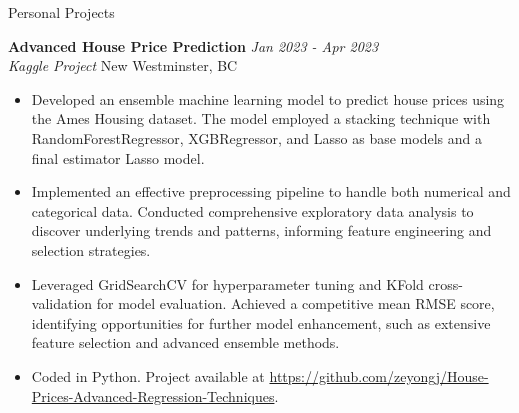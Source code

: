 \documentclass{resume} %
\begin{document}
\begin{rSection}{Personal Projects}

{\bf Advanced House Price Prediction} \hfill {\em Jan 2023 - Apr 2023}
\\{\textit{Kaggle Project} \hfill {New Westminster, BC}}
\begin{itemize}
    \vspace{-0.2cm}\item Developed an ensemble machine learning model to predict house prices using the Ames Housing dataset. The model employed a stacking technique with RandomForestRegressor, XGBRegressor, and Lasso as base models and a final estimator Lasso model.
    \vspace{-0.2cm}\item Implemented an effective preprocessing pipeline to handle both numerical and categorical data. Conducted comprehensive exploratory data analysis to discover underlying trends and patterns, informing feature engineering and selection strategies.
    \vspace{-0.2cm}\item Leveraged GridSearchCV for hyperparameter tuning and KFold cross-validation for model evaluation. Achieved a competitive mean RMSE score, identifying opportunities for further model enhancement, such as extensive feature selection and advanced ensemble methods.
    \vspace{-0.2cm}\item Coded in Python. Project available at \url{https://github.com/zeyongj/House-Prices-Advanced-Regression-Techniques}.
\end{itemize}



\end{rSection}
\end{document}
